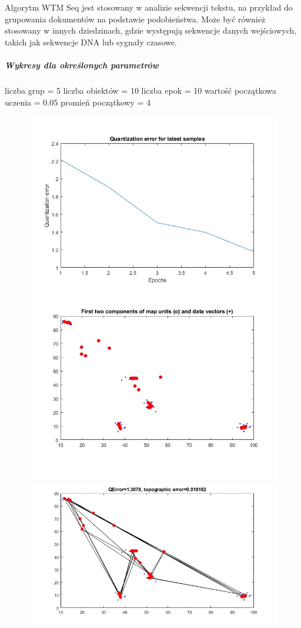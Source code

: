 \documentclass[11pt]{article}
\begin{document}
Algorytm WTM Seq jest stosowany w analizie sekwencji tekstu, na przykład
do grupowania dokumentów na podstawie podobieństwa. Może być również
stosowany w innych dziedzinach, gdzie występują sekwencje danych
wejściowych, takich jak sekwencje DNA lub sygnały czasowe.

\hypertarget{wykresy-dla-okreux15blonych-parametruxf3w-3}{%
\subparagraph{Wykresy dla określonych
parametrów}\label{wykresy-dla-okreux15blonych-parametruxf3w-3}}

liczba grup = 5 liczba obiektów = 10 liczba epok = 10 wartość początkowa
uczenia = 0.05 promień początkowy = 4

\begin{figure}[h!]
  \includegraphics{screeny/WTM_seq/WTM_seq_5_groups/WTM_seq_learning_process.jpg}
  \includegraphics{screeny/WTM_seq/WTM_seq_5_groups/WTM_seq_Graph.jpg}

\end{figure}
\end{document}
